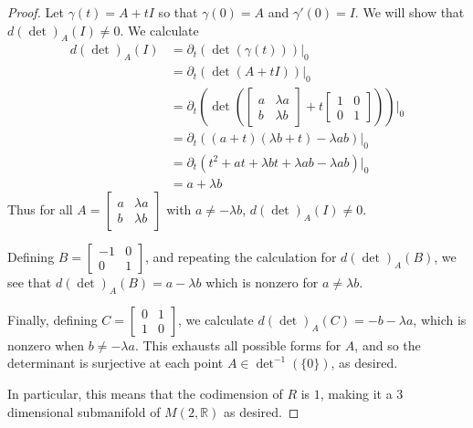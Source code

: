 \documentclass[fontsize=11pt]{scrartcl} %
\numberwithin{equation}{section} %
\numberwithin{figure}{section} %
\numberwithin{table}{section} %
\newcommand{\R}{\mathbb{R}}
\begin{document}
\begin{proof}
    Let $\gamma(t) = A +tI$ so that $\gamma(0)=A$ and $\gamma'(0)=I$. We will
    show that $d(\det)_A(I) \neq 0$. We calculate
    \[
        \begin{aligned}
            d(\det)_A(I) &= \partial_t(\det(\gamma(t)))|_0\\
            &=\partial_t(\det(A+tI))|_0\\
            &=\partial_t\left(\det\left(
                    \begin{bmatrix}
                        a &\lambda a\\
                        b &\lambda b
                    \end{bmatrix}
                    + t
                    \begin{bmatrix}
                        1&0\\
                        0&1
            \end{bmatrix}\right)\right)|_0\\
            &=\partial_t\left( (a+t)(\lambda b+t)-\lambda ab \right)|_0\\
            &=\partial_t\left( t^2 + at + \lambda bt + \lambda ab - \lambda ab
            \right)|_0\\
            &= a+\lambda b
        \end{aligned}
    \]
    Thus for all $A = \begin{bmatrix}a&\lambda a\\b&\lambda b\end{bmatrix}$ with
    $a\neq -\lambda b$, $d(\det)_A(I)\neq 0$.

    Defining $B=\begin{bmatrix}-1&0\\0&1\end{bmatrix}$, and repeating the
    calculation for $d(\det)_A(B)$, we see
    that $d(\det)_A(B) = a - \lambda b$ which is nonzero for $a\neq \lambda b$.

    Finally, defining $C = \begin{bmatrix}0&1\\1&0\end{bmatrix}$, we calculate
    $d(\det)_A(C) = -b-\lambda a$, which is nonzero when $b\neq -\lambda a$.
    This exhausts all possible forms for $A$, and so the determinant is
    surjective at each point $A\in {\det}^{-1}(\{0\})$, as desired.

    In particular, this means that the codimension of $R$ is $1$, making it a 3
    dimensional submanifold of $M(2,\R)$ as desired.
\end{proof}
\end{document}
